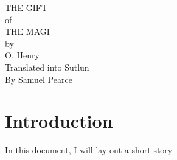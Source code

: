 \documentclass{book}
\begin{document}
\begingroup
\centering
\vfill
\Huge{THE GIFT}\\
\huge{of}\\
\Huge{THE MAGI}\\
\huge{by}\\
\huge{O. Henry}\\
\vspace{3cm}
\Large{Translated into Sutlun}\\
\Large{By Samuel Pearce}\\
\vfill\null
\endgroup
\thispagestyle{empty}

\tableofcontents
\pagebreak

\section{Introduction}
In this document, I will lay out a short story
\end{document}
